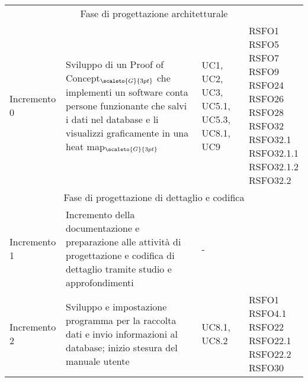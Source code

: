 \begin{center}
	\renewcommand{\arraystretch}{1.4}
	\begin{longtable}[c]{p{3cm}|p{5cm}|p{4cm}|p{3cm}}
		\hline
		\rowcolor{airforceblue}
		\makecell[c]{\textbf{Incremento}} & \makecell[c]{\textbf{Obiettivi}} & \makecell[c]{\textbf{Casi d'uso}} &  \makecell[c]{\textbf{Requisiti}}\\
		\hline
		\multicolumn{4}{|c|}{Fase di progettazione architetturale}\\
		\hline
		\centering Incremento 0 & \centering Sviluppo di un
		Proof of Concept$_{\scaleto{G}{3pt}}$ che implementi un software conta persone funzionante che salvi i dati nel database e li visualizzi graficamente in una heat map$_{\scaleto{G}{3pt}}$ & \centering  UC1, UC2, UC3, UC5.1, UC5.3, UC8.1, UC9 & \makecell[tc]{RSFO1 \\ RSFO5 \\ RSFO7 \\ RSFO9 \\ RSFO24 \\ RSFO26 \\ RSFO28 \\ RSFO32 \\ RSFO32.1 \\ RSFO32.1.1 \\ RSFO32.1.2 \\ RSFO32.2} \\
		\hline
		\multicolumn{4}{|c|}{Fase di progettazione di dettaglio e codifica}\\
		\hline
		\centering Incremento 1 & \centering Incremento della documentazione e preparazione alle attività di progettazione e codifica di dettaglio tramite studio e approfondimenti & \centering - & \makecell[tc]{-} \\
		\hline
		\centering Incremento 2 & \centering Sviluppo e impostazione programma per la raccolta dati e invio informazioni al database; inizio stesura del manuale utente & \centering UC8.1, UC8.2 & \makecell[tc]{RSFO1 \\ RSFO4.1 \\ RSFO22 \\ RSFO22.1 \\ RSFO22.2 \\ RSFO30} \\
		\hline

\end{longtable}
\end{center}
